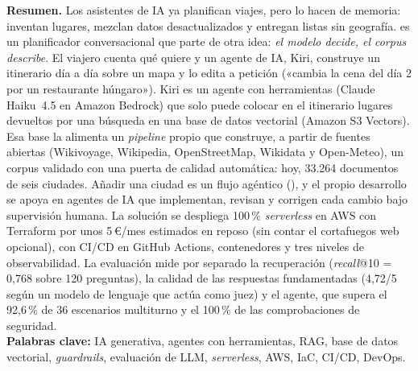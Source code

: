 \noindent\colorbox{klight}{\parbox{\dimexpr\textwidth-2\fboxsep}{\small
\textbf{Resumen.} Los asistentes de IA ya planifican viajes, pero lo hacen de memoria: inventan
lugares, mezclan datos desactualizados y entregan listas sin geografía. \kyrian{} es un
planificador conversacional que parte de otra idea: \emph{el modelo decide, el corpus describe}. El
viajero cuenta qué quiere y un agente de IA, Kiri, construye un itinerario día a día sobre un mapa
y lo edita a petición («cambia la cena del día 2 por un restaurante húngaro»). Kiri es un agente con
herramientas (Claude Haiku~4.5 en Amazon Bedrock) que solo puede colocar en el itinerario lugares
devueltos por una búsqueda en una base de datos vectorial (Amazon S3 Vectors). Esa base la
alimenta un \emph{pipeline} propio que construye, a partir de fuentes abiertas (Wikivoyage, Wikipedia,
OpenStreetMap, Wikidata y Open-Meteo), un corpus validado con una puerta de calidad automática: hoy, 33.264
documentos de seis ciudades. Añadir una ciudad es un flujo agéntico (), y el propio
desarrollo se apoya en agentes de IA que implementan, revisan y corrigen cada cambio bajo
supervisión humana. La solución se
despliega 100\,\% \emph{serverless} en AWS con Terraform por unos 5\,€/mes estimados en reposo (sin contar el cortafuegos web opcional),
con CI/CD en GitHub Actions, contenedores y tres niveles de observabilidad. La evaluación mide por
separado la recuperación (\emph{recall}@10 = 0,768 sobre 120 preguntas), la calidad de las respuestas
fundamentadas (4,72/5 según un modelo de lenguaje que actúa como juez) y el agente, que supera el 92,6\,\% de 36 escenarios multiturno y el
100\,\% de las comprobaciones de seguridad.\\[2pt]
\textbf{Palabras clave:} IA generativa, agentes con herramientas, RAG, base de datos vectorial,
\emph{guardrails}, evaluación de LLM, \emph{serverless}, AWS, IaC, CI/CD, DevOps.}}

